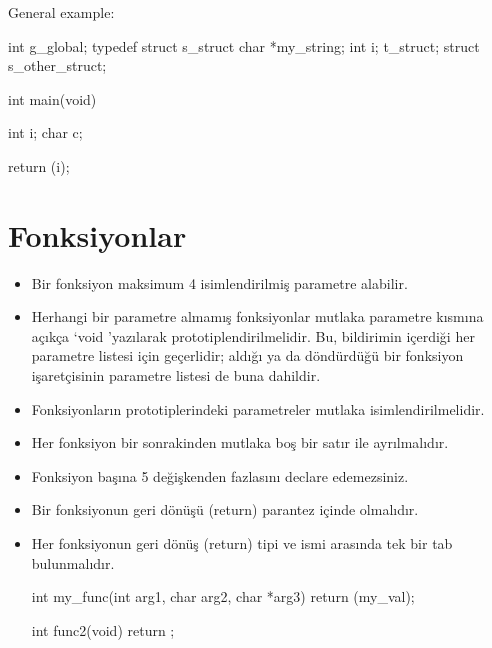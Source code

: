 \documentclass{42-en}
\begin{document}
            \newpage

            General example:
            \begin{42ccode}
int             g_global;
typedef struct  s_struct
{
    char    *my_string;
    int     i;
}               t_struct;
struct          s_other_struct;

int     main(void)
{
    int     i;
    char    c;

    return (i);
}
            \end{42ccode}
            \newpage

    \section{Fonksiyonlar}

        \begin{itemize}

            \item Bir fonksiyon maksimum 4 isimlendirilmiş parametre alabilir.

            \item Herhangi bir parametre almamış fonksiyonlar mutlaka parametre kısmına açıkça ‘void ’yazılarak prototiplendirilmelidir.
Bu, bildirimin içerdiği her parametre listesi için geçerlidir; aldığı ya da döndürdüğü bir
fonksiyon işaretçisinin parametre listesi de buna dahildir.

            \item Fonksiyonların prototiplerindeki parametreler mutlaka isimlendirilmelidir.

            \item Her fonksiyon bir sonrakinden mutlaka boş bir satır ile ayrılmalıdır.

            \item Fonksiyon başına 5 değişkenden fazlasını declare edemezsiniz.

            \item Bir fonksiyonun geri dönüşü (return) parantez içinde olmalıdır. 

            \item Her fonksiyonun geri dönüş (return) tipi ve ismi arasında tek bir tab bulunmalıdır.

            \begin{42ccode}
int my_func(int arg1, char arg2, char *arg3)
{
    return (my_val);
}

int func2(void)
{
    return ;
}
            \end{42ccode}

        \end{itemize}
        \newpage
\end{document}
